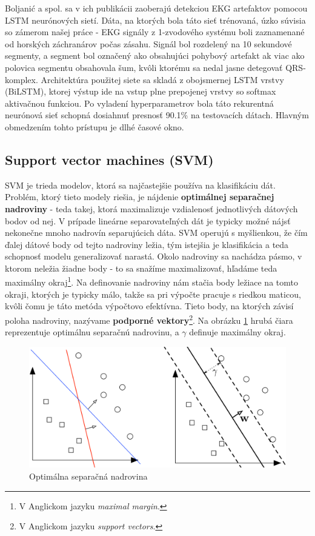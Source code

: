 Boljanić a spol.\cite{boljanic2022} sa v ich publikácii zaoberajú detekciou EKG artefaktov pomocou LSTM neurónových sietí. Dáta, na ktorých bola táto sieť trénovaná, úzko súvisia so zámerom našej práce - EKG signály z 1-zvodového systému boli zaznamenané od horských záchranárov počas zásahu. Signál bol rozdelený na 10 sekundové segmenty, a segment bol označený ako obsahujúci pohybový artefakt ak viac ako polovica segmentu obsahovala šum, kvôli ktorému sa nedal jasne detegovať QRS-komplex. Architektúra použitej siete sa skladá z obojsmernej LSTM vrstvy (BiLSTM), ktorej výstup ide na vstup plne prepojenej vrstvy so softmax aktivačnou funkciou. Po vyladení hyperparametrov bola táto rekurentná neurónová sieť schopná dosiahnuť presnosť 90.1\% na testovacích dátach. Hlavným obmedzením tohto prístupu je dlhé časové okno.

\subsection{Support vector machines (SVM)}

SVM je trieda modelov, ktorá sa najčastejšie používa na klasifikáciu dát. Problém, ktorý tieto modely riešia, je nájdenie \textbf{optimálnej separačnej nadroviny} - teda takej, ktorá maximalizuje vzdialenosť jednotlivých dátových bodov od nej. V prípade lineárne separovateľných dát je typicky možné nájsť nekonečne mnoho nadrovín separujúcich dáta. SVM operujú s myšlienkou, že čím ďalej dátové body od tejto nadroviny ležia, tým istejšia je klasifikácia a teda schopnosť modelu generalizovať narastá. Okolo nadroviny sa nachádza pásmo, v ktorom neležia žiadne body - to sa snažíme maximalizovať, hľadáme teda maximálny okraj\footnote{V Anglickom jazyku \textit{maximal margin}.}. Na definovanie nadroviny nám stačia body ležiace na tomto okraji, ktorých je typicky málo, takže sa pri výpočte pracuje s riedkou maticou, kvôli čomu je táto metóda výpočtovo efektívna. Tieto body, na ktorých závisí poloha nadroviny, nazývame \textbf{podporné vektory}\footnote{V Anglickom jazyku \textit{support vectors}.}. Na obrázku \ref{fig:margin} hrubá čiara reprezentuje optimálnu separačnú nadrovinu, a \textit{\( \gamma \)} definuje maximálny okraj.\cite{Cristianini_Scholkopf_2002}\cite{Suthaharan2016}

\begin{figure}[H]
    \centering
    \includegraphics[scale=0.5]{img/margin.png}
    \caption{Optimálna separačná nadrovina\cite{Lecture_SVM}}
    \label{fig:margin}
\end{figure}

